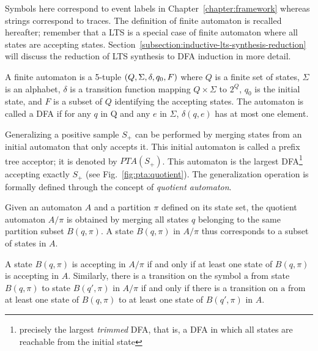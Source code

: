 Symbols here correspond to event labels in Chapter~\ref{chapter:framework} whereas strings correspond to traces. The definition of finite automaton is recalled hereafter; remember that a LTS is a special case of finite automaton where all states are accepting states. Section~\ref{subsection:inductive-lts-synthesis-reduction} will discuss the reduction of LTS synthesis to DFA induction in more detail. 

\begin{definition}
A finite automaton is a 5-tuple $(Q,\Sigma,\\\delta,q_0,F)$ where $Q$ is a finite set of states, $\Sigma$ is an alphabet, $\delta$ is a transition function mapping $Q\times\Sigma$ to $2^Q$, $q_0$ is the initial state, and $F$ is a subset of $Q$ identifying the accepting states. The automaton is called a DFA if for any $q$ in Q and any $e$ in $\Sigma$, $\delta(q,e)$ has at most one element. 
\end{definition}

Generalizing a positive sample $S_+$ can be performed by merging states from an initial automaton that only accepts it. This initial automaton is called a prefix tree acceptor; it is denoted by $PTA(S_+)$. This automaton is the largest DFA\footnote{precisely the largest \emph{trimmed} DFA, that is, a DFA in which all states are reachable from the initial state} accepting exactly $S_+$ (see Fig.~\ref{fig:pta:quotient}). The generalization operation is formally defined through the concept of \emph{quotient automaton}.

\begin{definition}
Given an automaton $A$ and a partition $\pi$ defined on its state set, the quotient automaton $A/\pi$ is obtained by merging all states $q$ belonging to the same partition subset $B(q,\pi)$. A state $B(q,\pi)$ in $A/\pi$ thus corresponds to a subset of states in $A$. 

A state $B(q,\pi)$ is accepting in $A/\pi$ if and only if at least one state of $B(q,\pi)$ is accepting in $A$. Similarly, there is a transition on the symbol $\mathrm{a}$ from state $B(q,\pi)$ to state $B(q',\pi)$ in $A/\pi$ if and only if there is a transition on $\mathrm{a}$ from at least one state of $B(q,\pi)$ to at least one state of $B(q',\pi)$ in $A$. 
\label{definition:quotient-automaton}
\end{definition}

